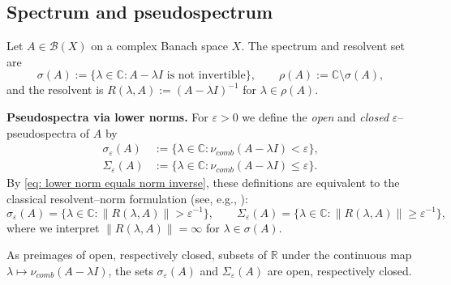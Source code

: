 \documentclass[11pt]{article}
\theoremstyle{definition}
\newcommand{\C}{\mathbb{C}}
\newcommand{\R}{\mathbb{R}}
\begin{document}
\subsection{Spectrum and pseudospectrum}
\label{sec:pseudospectrum}

Let $A\in\mathcal{B}(X)$ on a complex Banach space $X$.
The spectrum and resolvent set are
\[
  \sigma(A) := \{\lambda\in\C : A-\lambda I \text{ is not invertible}\},
  \qquad
  \rho(A):=\C\setminus\sigma(A),
\]
and the resolvent is $R(\lambda,A):=(A-\lambda I)^{-1}$ for $\lambda\in\rho(A)$.

\medskip

\noindent
\textbf{Pseudospectra via lower norms.}
For $\varepsilon>0$ we define the \emph{open} and \emph{closed}
$\varepsilon$--pseudospectra of $A$ by
\begin{align}
  \sigma_\varepsilon(A)
  &:= \{\lambda\in\C : \nu_{comb}(A-\lambda I) < \varepsilon\},\label{eq:pseudo-open}\\
  \Sigma_\varepsilon(A)
  &:= \{\lambda\in\C : \nu_{comb}(A-\lambda I) \le \varepsilon\}.\label{eq:pseudo-closed}
\end{align}
By \eqref{eq: lower norm equals norm inverse}, these definitions are equivalent to the
classical resolvent--norm formulation (see, e.g.,
\cite{Globevnik1976,DaviesShargorodsky2015,TrefethenEmbree2005}):
\[
  \sigma_\varepsilon(A)
  = \{\lambda\in\C : \|R(\lambda,A)\| > \varepsilon^{-1}\},
  \qquad
  \Sigma_\varepsilon(A)
  = \{\lambda\in\C : \|R(\lambda,A)\| \ge \varepsilon^{-1}\},
\]
where we interpret $\|R(\lambda,A)\|=\infty$ for $\lambda\in\sigma(A)$.

\medskip

\noindent
As preimages of open, respectively closed, subsets of\/ $\R$ under the continuous map
$\lambda\mapsto \nu_{comb}(A-\lambda I)$, the sets $\sigma_\varepsilon(A)$ and
$\Sigma_\varepsilon(A)$ are open, respectively closed.

\medskip
\end{document}
